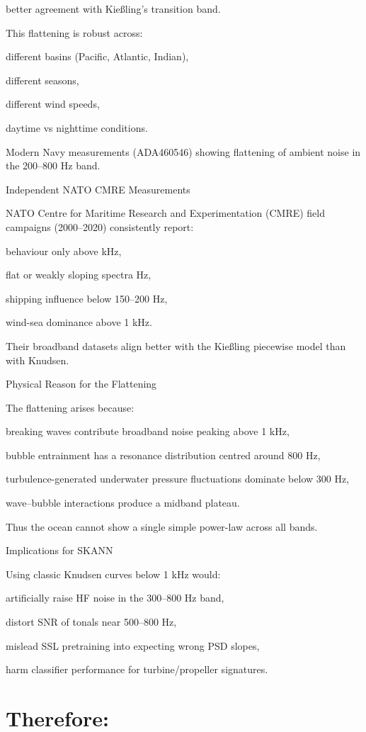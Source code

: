 \documentclass[12pt]{article}
\begin{document}
better agreement with Kießling’s transition band.

This flattening is robust across:

different basins (Pacific, Atlantic, Indian),

different seasons,

different wind speeds,

daytime vs nighttime conditions.

Modern Navy measurements (ADA460546) showing flattening of ambient noise in the 200–800 Hz band.

Independent NATO CMRE Measurements

NATO Centre for Maritime Research and Experimentation (CMRE) field campaigns (2000–2020) consistently report:

behaviour only above  kHz,

flat or weakly sloping spectra  Hz,

shipping influence below 150–200 Hz,

wind-sea dominance above 1 kHz.

Their broadband datasets align better with the Kießling piecewise model than with Knudsen.

Physical Reason for the Flattening

The flattening arises because:

breaking waves contribute broadband noise peaking above 1 kHz,

bubble entrainment has a resonance distribution centred around 800 Hz,

turbulence-generated underwater pressure fluctuations dominate below 300 Hz,

wave–bubble interactions produce a midband plateau.

Thus the ocean cannot show a single simple power-law across all bands.

Implications for SKANN

Using classic Knudsen curves below 1 kHz would:

artificially raise HF noise in the 300–800 Hz band,

distort SNR of tonals near 500–800 Hz,

mislead SSL pretraining into expecting wrong PSD slopes,

harm classifier performance for turbine/propeller signatures.

\section*{Therefore:}
\end{document}
